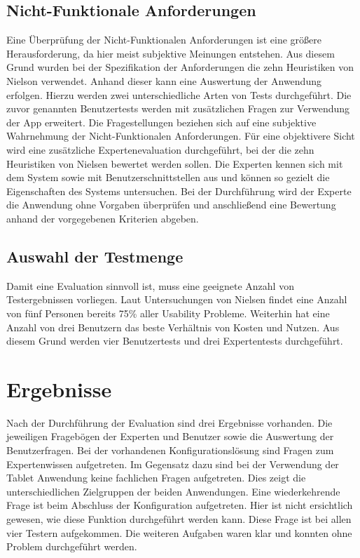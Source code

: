 \subsection{Nicht-Funktionale Anforderungen}
Eine Überprüfung der Nicht-Funktionalen Anforderungen ist eine größere Herausforderung, da hier meist subjektive Meinungen entstehen. Aus diesem Grund wurden bei der Spezifikation der Anforderungen die zehn Heuristiken von Nielson verwendet. Anhand dieser kann eine Auswertung der Anwendung erfolgen. Hierzu werden zwei unterschiedliche Arten von Tests durchgeführt. Die zuvor genannten Benutzertests werden mit zusätzlichen Fragen zur Verwendung der App erweitert. Die Fragestellungen beziehen sich auf eine subjektive Wahrnehmung der Nicht-Funktionalen Anforderungen. Für eine objektivere Sicht wird eine zusätzliche Expertenevaluation durchgeführt, bei der die zehn Heuristiken von Nielsen bewertet werden sollen. Die Experten kennen sich mit dem System sowie mit Benutzerschnittstellen aus und können so gezielt die Eigenschaften des Systems untersuchen. Bei der Durchführung wird der Experte die Anwendung ohne Vorgaben überprüfen und anschließend eine Bewertung anhand der vorgegebenen Kriterien abgeben. 

\subsection{Auswahl der Testmenge}
Damit eine Evaluation sinnvoll ist, muss eine geeignete Anzahl von Testergebnissen vorliegen. Laut Untersuchungen von Nielsen \cite{bib:countTests} findet eine Anzahl von fünf Personen bereits 75\% aller Usability Probleme. Weiterhin hat eine Anzahl von drei Benutzern das beste Verhältnis von Kosten und Nutzen. Aus diesem Grund werden vier Benutzertests und drei Expertentests durchgeführt. 

\section{Ergebnisse}
Nach der Durchführung der Evaluation sind drei Ergebnisse vorhanden. Die jeweiligen Fragebögen der Experten und Benutzer sowie die Auswertung der Benutzerfragen. Bei der vorhandenen Konfigurationslösung sind Fragen zum Expertenwissen aufgetreten. Im Gegensatz dazu sind bei der Verwendung der Tablet Anwendung keine fachlichen Fragen aufgetreten. Dies zeigt die unterschiedlichen Zielgruppen der beiden Anwendungen. Eine wiederkehrende Frage ist beim Abschluss der Konfiguration aufgetreten. Hier ist nicht ersichtlich gewesen, wie diese Funktion durchgeführt werden kann. Diese Frage ist bei allen vier Testern aufgekommen. Die weiteren Aufgaben waren klar und konnten ohne Problem durchgeführt werden. 



